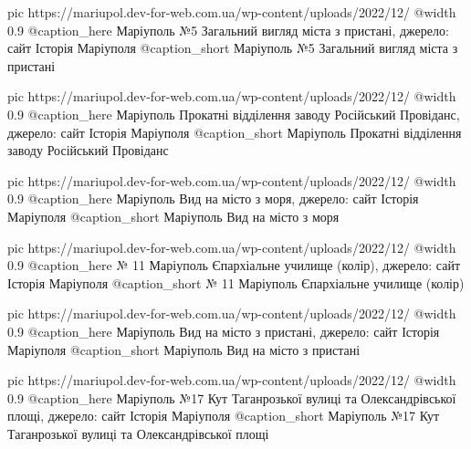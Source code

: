 	pic https://mariupol.dev-for-web.com.ua/wp-content/uploads/2022/12/%
	@width 0.9
	@caption_here Маріуполь №5 Загальний вигляд міста з пристані, джерело: сайт Історія Маріуполя
	@caption_short Маріуполь №5 Загальний вигляд міста з пристані

	pic https://mariupol.dev-for-web.com.ua/wp-content/uploads/2022/12/%
	@width 0.9
	@caption_here Маріуполь Прокатні відділення заводу Російський Провіданс, джерело: сайт Історія Маріуполя
	@caption_short Маріуполь Прокатні відділення заводу Російський Провіданс

	pic https://mariupol.dev-for-web.com.ua/wp-content/uploads/2022/12/%
	@width 0.9
	@caption_here Маріуполь Вид на місто з моря, джерело: сайт Історія Маріуполя
	@caption_short Маріуполь Вид на місто з моря

	pic https://mariupol.dev-for-web.com.ua/wp-content/uploads/2022/12/%
	@width 0.9
	@caption_here № 11 Маріуполь Єпархіальне училище (колір), джерело: сайт Історія Маріуполя
	@caption_short № 11 Маріуполь Єпархіальне училище (колір)

	pic https://mariupol.dev-for-web.com.ua/wp-content/uploads/2022/12/%
	@width 0.9
	@caption_here Маріуполь Вид на місто з пристані, джерело: сайт Історія Маріуполя
	@caption_short Маріуполь Вид на місто з пристані

	pic https://mariupol.dev-for-web.com.ua/wp-content/uploads/2022/12/%
	@width 0.9
	@caption_here Маріуполь №17 Кут Таганрозької вулиці та Олександрівської площі, джерело: сайт Історія Маріуполя
	@caption_short Маріуполь №17 Кут Таганрозької вулиці та Олександрівської площі

